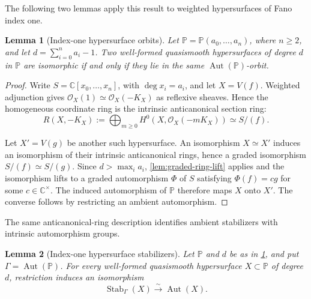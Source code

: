\documentclass[11pt]{article}
\theoremstyle{plain}
\newtheorem{lemma}[lemma]{Lemma}
\theoremstyle{definition}
\theoremstyle{remark}
\newcommand{\Pp}{\mathbb P}
\newcommand{\C}{\mathbb C}
\newcommand{\OO}{\mathcal O}
\begin{document}
The following two lemmas apply this result to weighted hypersurfaces of
Fano index one.

\begin{lemma}[Index-one hypersurface orbits]
\label{lem:X10-hypersurface-parameters}
Let \(\Pp=\Pp(a_0,\ldots,a_n)\), where \(n\geq2\), and let
\(d=\sum_{i=0}^n a_i-1\). Two well-formed quasismooth hypersurfaces of
degree \(d\) in \(\Pp\) are isomorphic if and only if they lie in the
same \(\operatorname{Aut}(\Pp)\)-orbit.
\end{lemma}

\begin{proof}
Write \(S=\C[x_0,\ldots,x_n]\), with \(\deg x_i=a_i\), and let
\(X=V(f)\). Weighted adjunction \cite{Dolgachev1982} gives
\(\OO_X(1)\simeq\OO_X(-K_X)\) as reflexive sheaves. Hence the homogeneous
coordinate ring is the intrinsic anticanonical section ring:
\[
R(X,-K_X):=\bigoplus_{m\geq0}H^0(X,\OO_X(-mK_X))
\simeq S/(f).
\]

Let \(X'=V(g)\) be another such hypersurface. An isomorphism
\(X\simeq X'\) induces an isomorphism of their intrinsic anticanonical
rings, hence a graded isomorphism \(S/(f)\simeq S/(g)\). Since
\(d>\max_i a_i\), \cref{lem:graded-ring-lift} applies and
the isomorphism lifts to a graded automorphism \(\Phi\) of
\(S\) satisfying \(\Phi(f)=cg\) for some \(c\in\C^\times\). The induced
automorphism of \(\Pp\) therefore maps \(X\) onto \(X'\). The converse
follows by restricting an ambient automorphism.
\end{proof}

The same anticanonical-ring description identifies ambient stabilizers
with intrinsic automorphism groups.

\begin{lemma}[Index-one hypersurface stabilizers]
\label{lem:X10-hypersurface-stabilizers}
Let \(\Pp\) and \(d\) be as in \cref{lem:X10-hypersurface-parameters},
and put \(\Gamma=\operatorname{Aut}(\Pp)\). For every well-formed
quasismooth hypersurface \(X\subset\Pp\) of degree \(d\), restriction
induces an isomorphism
\[
\operatorname{Stab}_\Gamma(X)\xrightarrow{\sim}\operatorname{Aut}(X).
\]
\end{lemma}
\end{document}
